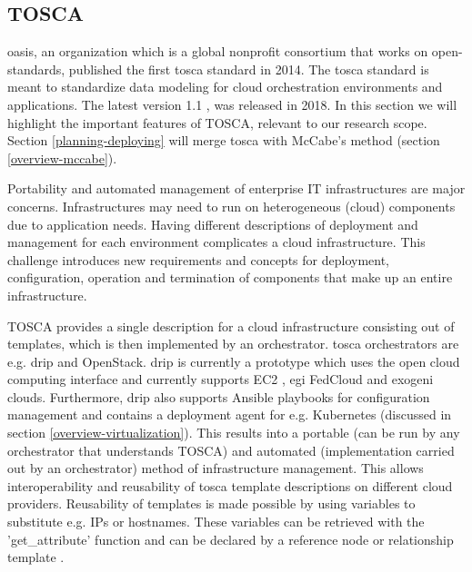 \subsection{TOSCA}
\label{overview-tosca}
\gls{oasis}, an organization which is a global nonprofit consortium that works on open-standards, published the first \gls{tosca} standard in 2014. The \gls{tosca} standard is meant to standardize data modeling for cloud orchestration environments and applications. The latest version 1.1 \cite{tosca-standard}, was released in 2018. In this section we will highlight the important features of TOSCA, relevant to our research scope. Section \ref{planning-deploying} will merge \gls{tosca} with McCabe's method (section \ref{overview-mccabe}).

Portability and automated management of enterprise IT infrastructures are major concerns. Infrastructures may need to run on heterogeneous (cloud) components due to application needs. Having different descriptions of deployment and management for each environment complicates a cloud infrastructure. This challenge introduces new requirements and concepts for deployment, configuration, operation and termination of components that make up an entire infrastructure.

TOSCA provides a single description for a cloud infrastructure consisting out of templates, which is then implemented by an orchestrator. \gls{tosca} orchestrators are e.g. \gls{drip} and OpenStack. \gls{drip} is currently a prototype which uses the open cloud computing interface and currently supports EC2 \cite{amazon-website}, \gls{egi} FedCloud \cite{egi-website} and \gls{exogeni} \cite{exogeni-website} clouds. Furthermore, \gls{drip} also supports Ansible playbooks \cite{ansible-website} for configuration management and contains a deployment agent for e.g. Kubernetes (discussed in section \ref{overview-virtualization}). This results into a portable (can be run by any orchestrator that understands TOSCA) and automated (implementation carried out by an orchestrator) method of infrastructure management. This allows interoperability and reusability of \gls{tosca} template descriptions on different cloud providers. Reusability of templates is made possible by using variables to substitute e.g. IPs or hostnames. These variables can be retrieved with the 'get\_attribute' function and can be declared by a reference node or relationship template \cite{tosca-attributes}.

